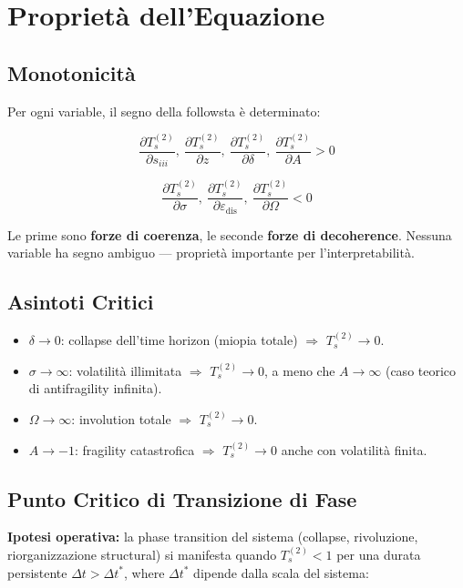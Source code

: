 \section{Proprietà dell'Equazione}\label{proprietuxe0-dellequation}

\subsection{Monotonicità}\label{monotonicituxe0}

\Proved{} Per ogni variable, il segno della followsta è determinato:

\[
\frac{\partial T_s^{(2)}}{\partial s_{iii}},\ \frac{\partial T_s^{(2)}}{\partial z},\ \frac{\partial T_s^{(2)}}{\partial \delta},\ \frac{\partial T_s^{(2)}}{\partial A} > 0
\]

\[
\frac{\partial T_s^{(2)}}{\partial \sigma},\ \frac{\partial T_s^{(2)}}{\partial \varepsilon_{\text{dis}}},\ \frac{\partial T_s^{(2)}}{\partial \Omega} < 0
\]

Le prime sono \textbf{forze di coerenza}, le seconde \textbf{forze di
decoherence}. Nessuna variable ha segno ambiguo --- proprietà importante
per l'interpretabilità.

\subsection{Asintoti Critici}\label{asintoti-critici}

\begin{itemize}
\tightlist
\item
  \(\delta \to 0\): collapse dell'time horizon (miopia totale) $\Rightarrow$
  \(T_s^{(2)} \to 0\).
\item
  \(\sigma \to \infty\): volatilità illimitata $\Rightarrow$ \(T_s^{(2)} \to 0\), a
  meno che \(A \to \infty\) (caso teorico di antifragility infinita).
\item
  \(\Omega \to \infty\): involution totale $\Rightarrow$ \(T_s^{(2)} \to 0\).
\item
  \(A \to -1\): fragility catastrofica $\Rightarrow$ \(T_s^{(2)} \to 0\) anche con
  volatilità finita.
\end{itemize}

\subsection{Punto Critico di Transizione di
Fase}\label{punto-critico-di-transizione-di-fase}

\Hypoth{} \textbf{Ipotesi operativa:} la phase transition del sistema
(collapse, rivoluzione, riorganizzazione structural) si manifesta
quando \(T_s^{(2)} < 1\) per una durata persistente
\(\Delta t > \Delta t^*\), where \(\Delta t^*\) dipende dalla scala del
sistema:

